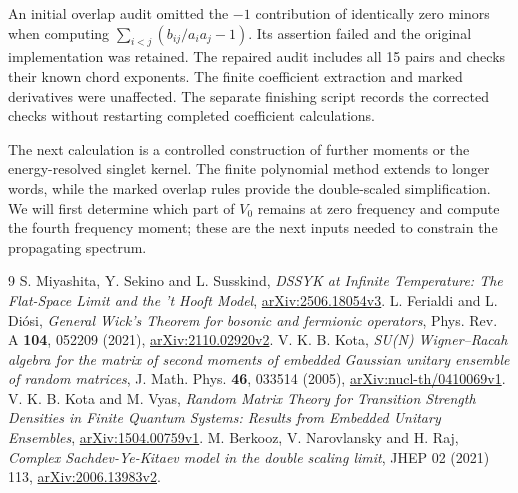\documentclass[11pt,a4paper]{article}
\begin{document}
An initial overlap audit omitted the $-1$ contribution of identically
zero minors when computing $\sum_{i<j}(b_{ij}/a_i a_j-1)$.
Its assertion failed and the original implementation was retained.
The repaired audit includes all 15 pairs and checks their known chord
exponents. The finite coefficient extraction and marked derivatives
were unaffected. The separate finishing script records the corrected
checks without restarting completed coefficient calculations.

The next calculation is a controlled construction of further moments
or the energy-resolved singlet kernel. The finite polynomial method
extends to longer words, while the marked overlap rules provide the
double-scaled simplification. We will first determine which part of
$V_0$ remains at zero frequency and compute the fourth frequency moment;
these are the next inputs needed to constrain the propagating spectrum.

\begin{thebibliography}{9}
 S. Miyashita, Y. Sekino and L. Susskind,
\emph{DSSYK at Infinite Temperature: The Flat-Space Limit and the
't Hooft Model},
\href{https://arxiv.org/html/2506.18054v3}{arXiv:2506.18054v3}.
 L. Ferialdi and L. Di\'osi,
\emph{General Wick's Theorem for bosonic and fermionic operators},
Phys. Rev. A \textbf{104}, 052209 (2021),
\href{https://arxiv.org/html/2110.02920v2}{arXiv:2110.02920v2}.
 V. K. B. Kota,
\emph{SU(N) Wigner--Racah algebra for the matrix of second moments of
embedded Gaussian unitary ensemble of random matrices},
J. Math. Phys. \textbf{46}, 033514 (2005),
\href{https://arxiv.org/html/nucl-th/0410069v1}{arXiv:nucl-th/0410069v1}.
 V. K. B. Kota and M. Vyas,
\emph{Random Matrix Theory for Transition Strength Densities in Finite
Quantum Systems: Results from Embedded Unitary Ensembles},
\href{https://arxiv.org/html/1504.00759v1}{arXiv:1504.00759v1}.
 M. Berkooz, V. Narovlansky and H. Raj,
\emph{Complex Sachdev-Ye-Kitaev model in the double scaling limit},
JHEP 02 (2021) 113,
\href{https://arxiv.org/html/2006.13983v2}{arXiv:2006.13983v2}.
\end{thebibliography}
\end{document}
